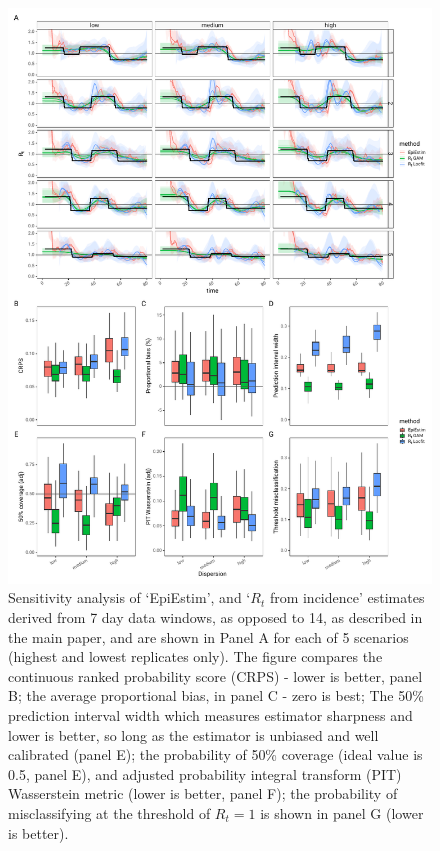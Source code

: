 \documentclass[a4paper, 12pt, twoside]{article}
\begin{document}
\begin{figure}[h!]
\centering
  \includegraphics{fig/fig5-7-day-scenario}
  \caption{Sensitivity analysis of `EpiEstim', and `$R_t$ from incidence' estimates derived from 7 day data windows, as opposed to 14, as described in the main paper, and are shown in Panel A for each of 5 scenarios (highest and lowest replicates only). The figure compares the continuous ranked probability score (CRPS) - lower is better, panel B; the average proportional bias, in panel C - zero is best; The 50\% prediction interval width which measures estimator sharpness and lower is better, so long as the estimator is unbiased and well calibrated (panel E); the probability of 50\% coverage (ideal value is 0.5, panel E), and adjusted probability integral transform (PIT) Wasserstein metric (lower is better, panel F); the probability of misclassifying at the threshold of $R_t=1$ is shown in panel G (lower is better).}
\label{fig:S5}
\end{figure}
\end{document}
